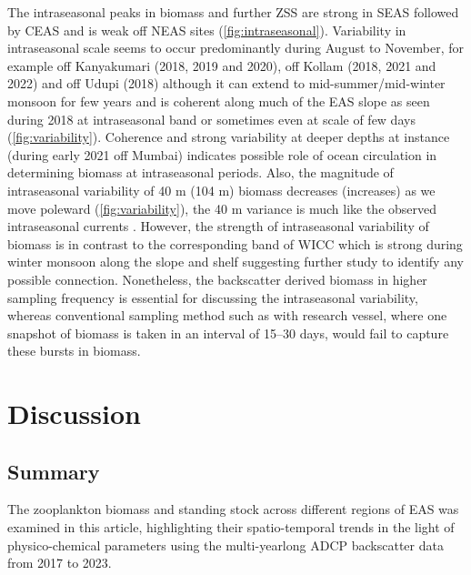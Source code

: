 \documentclass[authoryear,review,12pt]{elsarticle}
\begin{document}
	The intraseasonal peaks in biomass and further ZSS are strong in SEAS followed by CEAS and is weak off NEAS sites (\cref{fig:intraseasonal}). Variability in intraseasonal scale seems to occur predominantly during August to November, for example off Kanyakumari (2018, 2019 and 2020), off Kollam (2018, 2021 and 2022) and off Udupi (2018) although it can extend to mid-summer/mid-winter monsoon for few years and is coherent along much of the EAS slope as seen during 2018 at intraseasonal band or sometimes even at scale of few days (\cref{fig:variability}). Coherence and strong variability at deeper depths at instance (during early 2021 off Mumbai) indicates possible role of ocean circulation in determining biomass at intraseasonal periods. Also, the magnitude of intraseasonal variability of 40 m (104 m) biomass decreases (increases) as we move poleward (\cref{fig:variability}), the 40 m variance is much like the observed intraseasonal currents \citep{amol2014observed, chaudhuri2020observed,chaudhuri2021observed}. However, the strength of intraseasonal variability of biomass is in contrast to the corresponding band of WICC which is strong during winter monsoon along the slope \citep{amol2014observed, chaudhuri2020observed} and shelf \citep{chaudhuri2021observed} suggesting further study to identify any possible connection. Nonetheless, the backscatter derived biomass in higher sampling frequency is essential for discussing the intraseasonal variability, whereas conventional sampling method such as with research vessel, where one snapshot of biomass is taken in an interval of 15--30 days, would fail to capture these bursts in biomass.
	   

	\section{Discussion}
	
	\subsection{Summary}
	The zooplankton biomass and standing stock across different regions of EAS was examined in this article, highlighting their spatio-temporal trends in the light of physico-chemical parameters using the multi-yearlong ADCP backscatter data from 2017 to 2023. 
	
\end{document}
